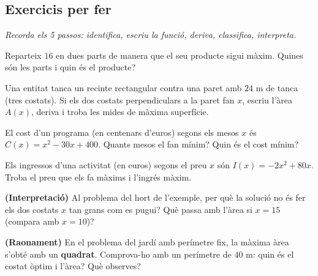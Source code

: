 \subsection{Exercicis per fer}

\noindent\textit{Recorda els 5 passos: identifica, escriu la funció, deriva, classifica,
interpreta.}

\begin{exercicis}
\begin{exlist}
  \item Reparteix $16$ en dues parts de manera que el seu producte sigui màxim. Quines
        són les parts i quin és el producte?
  \item Una entitat tanca un recinte rectangular contra una paret amb $24$ m de tanca
        (tres costats). Si els dos costats perpendiculars a la paret fan $x$, escriu
        l'àrea $A(x)$, deriva i troba les mides de màxima superfície.
  \item El cost d'un programa (en centenars d'euros) segons els mesos $x$ és
        $C(x)=x^2-30x+400$. Quants mesos el fan mínim? Quin és el cost mínim?
  \item Els ingressos d'una activitat (en euros) segons el preu $x$ són
        $I(x)=-2x^2+80x$. Troba el preu que els fa màxims i l'ingrés màxim.
  \item \textbf{(Interpretació)} Al problema del hort de l'exemple, per què la solució
        no és fer els dos costats $x$ tan grans com es pugui? Què passa amb l'àrea si
        $x=15$ (compara amb $x=10$)?
  \item \textbf{(Raonament)} En el problema del jardí amb perímetre fix, la màxima àrea
        s'obté amb un \textbf{quadrat}. Comprova-ho amb un perímetre de $40$ m: quin és
        el costat òptim i l'àrea? Què observes?
\end{exlist}
\end{exercicis}

